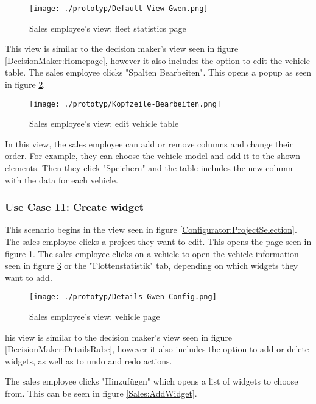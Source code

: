 \begin{figure}[H]
  \centering
  \texttt{[image: ./prototyp/Default-View-Gwen.png]}
  \caption{Sales employee's view: fleet statistics page}
  \label{Sales:VehicleList}
\end{figure}

This view is similar to the decision maker's view seen in figure \ref{DecisionMaker:Homepage}, however it also includes the option to edit the vehicle table. The sales employee clicks "Spalten Bearbeiten". This opens a popup as seen in figure \ref{Sales:EditTable}.

\begin{figure}[ht]
  \centering
  \texttt{[image: ./prototyp/Kopfzeile-Bearbeiten.png]}
  \caption{Sales employee's view: edit vehicle table}
  \label{Sales:EditTable}
\end{figure}

In this view, the sales employee can add or remove columns and change their order. For example, they can choose the vehicle model and add it to the shown elements. Then they click "Speichern" and the table includes the new column with the data for each vehicle.


\subsubsection{Use Case 11: Create \Gls{widget}}
This scenario begins in the view seen in figure \ref{Configurator:ProjectSelection}. The sales employee clicks a project they want to edit. This opens the page seen in figure \ref{Sales:VehicleList}. The sales employee clicks on a vehicle to open the vehicle information seen in figure \ref{Sales:VehicleInformation} or the "Flottenstatistik" tab, depending on which \glspl{widget} they want to add.

\begin{figure}[ht]
  \centering
  \texttt{[image: ./prototyp/Details-Gwen-Config.png]}
  \caption{Sales employee's view: vehicle page}
  \label{Sales:VehicleInformation}
\end{figure}

his view is similar to the decision maker's view seen in figure \ref{DecisionMaker:DetailsRube}, however it also includes the option to add or delete \glspl{widget}, as well as to undo and redo actions.

The sales employee clicks "Hinzufügen" which opens a list of \glspl{widget} to choose from. This can be seen in figure \ref{Sales:AddWidget}.

